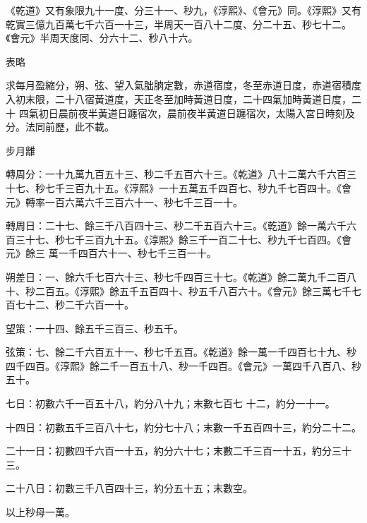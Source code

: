 \begin{pinyinscope}
 《乾道》又有象限九十一度、分三十一、秒九，《淳熙》、《會元》同。《淳熙》又有乾實三億九百萬七千六百一十三，半周天一百八十二度、分二十五、秒七十二。《會元》半周天度同、分六十二、秒八十六。



 表略



 求每月盈縮分，朔、弦、望入氣朏朒定數，赤道宿度，冬至赤道日度，赤道宿積度入初末限，二十八宿黃道度，天正冬至加時黃道日度，二十四氣加時黃道日度，二十
 四氣初日晨前夜半黃道日躔宿次，晨前夜半黃道日躔宿次，太陽入宮日時刻及分。法同前歷，此不載。



 步月離



 轉周分：一十九萬九百五十三、秒二千五百六十三。《乾道》八十二萬六千六百三十七、秒七千三百九十五。《淳熙》一十五萬五千四百七、秒九千七百四十。《會元》轉率一百六萬六千三百六十一、秒七千三百一十。



 轉周日：二十七、餘三千八百四十三、秒二千五百六十三。《乾道》餘一萬六千六百三十七、秒七千三百九十五。《淳熙》餘三千一百二十七、秒九千七百四。《會元》餘三
 萬一千四百六十一、秒七千三百一十。



 朔差日：一、餘六千七百六十三、秒七千四百三十七。《乾道》餘二萬九千二百八十、秒二百五。《淳熙》餘五千五百四十、秒五千八百六十。《會元》餘三萬七千七百七十二、秒二千六百一十。



 望策：一十四、餘五千三百三、秒五千。



 弦策：七、餘二千六百五十一、秒七千五百。《乾道》餘一萬一千四百七十九、秒四千四百。《淳熙》餘二千一百五十八、秒一千四百。《會元》一萬四千八百八、秒五十。



 七日：初數六千一百五十八，約分八十九；末數七百七
 十二，約分一十一。



 十四日：初數五千三百八十七，約分七十八；末數一千五百四十三，約分二十二。



 二十一日：初數四千六百一十五，約分六十七；末數二千三百一十五，約分三十三。



 二十八日：初數三千八百四十三，約分五十五；末數空。



 以上秒母一萬。




\end{pinyinscope}
